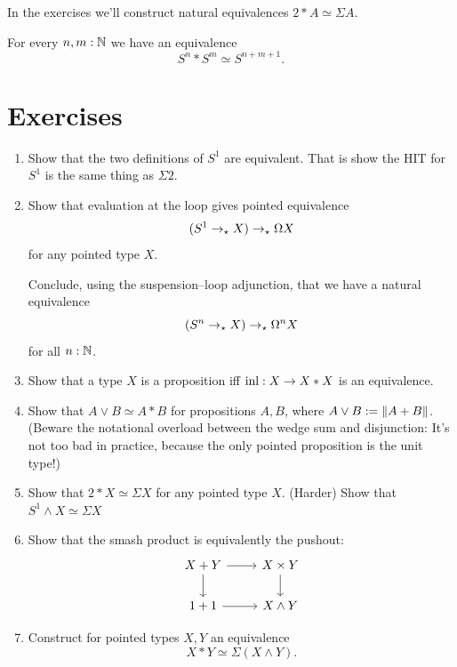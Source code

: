 \documentclass[10pt,oneside,leqno,openright]{memoir}
\begin{document}
In the exercises we'll construct natural equivalences $2*A\simeq \Sigma A$.
\begin{corollary}\label{cor:Sn-join-Sm}
  For every $n,m:\mathbb{N}$ we have an equivalence
  \[
    S^n * S^m \simeq S^{n+m+1}.
  \]
\end{corollary}

\section{Exercises}
\begin{enumerate}
\item Show that the two definitions of $S^1$ are equivalent. That is show the
  HIT for $S^1$ is the same thing as $\Sigma 2$.


\item Show that evaluation at the loop gives pointed equivalence
  \[
    (S^1 \to_\star X) \to_\star \Omega X
  \]
  for any pointed type $X$.

  Conclude, using the suspension--loop adjunction, that we have a natural equivalence
  \[
    (S^n \to_\star X) \to_\star \Omega^n X
  \]
  for all $n:\mathbb{N}$.

\item Show that a type $X$ is a proposition iff $\operatorname{inl} : X \to X \ast X$ is an equivalence.

\item Show that $A\vee B \simeq A*B$ for propositions $A,B$, where
  $A\vee B := \lVert A+B\rVert$.  (Beware the notational overload between the wedge
  sum and disjunction: It's not too bad in practice, because the only pointed
  proposition is the unit type!)

\item Show that $2 \ast X \simeq \Sigma X $ for any pointed type $X$. (Harder)
  Show that $S^1 \wedge X \simeq \Sigma X$

\item Show that the smash product is equivalently the pushout:
  \[
    \begin{tikzcd}
      X + Y \ar[d]\ar[r] & X \times Y\ar[d]\\
      1 + 1 \ar[r] & X \wedge Y
    \end{tikzcd}
  \]
\item Construct for pointed types $X,Y$ an equivalence
  \[X * Y \simeq \Sigma(X\wedge Y).\]


\end{enumerate}
\end{document}
